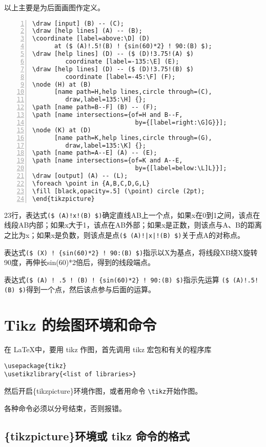 \documentclass[UTF8]{ctexart}
\begin{document}
以上主要是为后面画图作定义。

\begin{lstlisting}[name=example-3.2,numbers=left,    numberstyle=\footnotesize]
\draw [input] (B) -- (C);
\draw [help lines] (A) -- (B);
\coordinate [label=above:\D] (D) 
      at ($ (A)!.5!(B) ! {sin(60)*2} ! 90:(B) $);
\draw [help lines] (D) -- ($ (D)!3.75!(A) $) 
         coordinate [label=-135:\E] (E);
\draw [help lines] (D) -- ($ (D)!3.75!(B) $) 
         coordinate [label=-45:\F] (F);
\node (H) at (B) 
      [name path=H,help lines,circle through=(C),
         draw,label=135:\H] {};
\path [name path=B--F] (B) -- (F);
\path [name intersections={of=H and B--F,
                            by={[label=right:\G]G}}];
\node (K) at (D) 
      [name path=K,help lines,circle through=(G),
         draw,label=135:\K] {};
\path [name path=A--E] (A) -- (E);
\path [name intersections={of=K and A--E,
                            by={[label=below:\L]L}}];
\draw [output] (A) -- (L);
\foreach \point in {A,B,C,D,G,L}
\fill [black,opacity=.5] (\point) circle (2pt);
\end{tikzpicture}
\end{lstlisting}

23行，表达式\verb.($ (A)!x!(B) $).确定直线AB上一个点，如果x在0到1之间，该点在线段AB内部；如果x大于1，该点在AB外部；如果x是正数，则该点与A、B的距离之比为x；如果x是负数，则该点是点\verb.($ (A)!|x|!(B) $).关于点A的对称点。

表达式\verb.($ (X) ! {sin(60)*2} ! 90:(B) $).指示以X为基点，将线段XB绕X旋转90度，再伸长sin(60)*2倍后，得到的线段端点。


表达式\verb&($ (A) ! .5 ! (B) ! {sin(60)*2} ! 90:(B) $)&指示先运算
\verb&($ (A)!.5!(B) $)&得到一个点，然后该点参与后面的运算。


\section{Tikz 的绘图环境和命令}

在 \LaTeX 中，要用 tikz 作图，首先调用 tikz 宏包和有关的程序库
\begin{lstlisting}
\usepackage{tikz}
\usetikzlibrary{<list of libraries>}
\end{lstlisting}
然后开启\{tikzpicture\}环境作图，或者用命令 \verb=\tikz=开始作图。

{\large \heiti \color{red} 各种命令必须以分号结束，否则报错。 }



\subsection{\{tikzpicture\}环境或 tikz 命令的格式}
\end{document}
